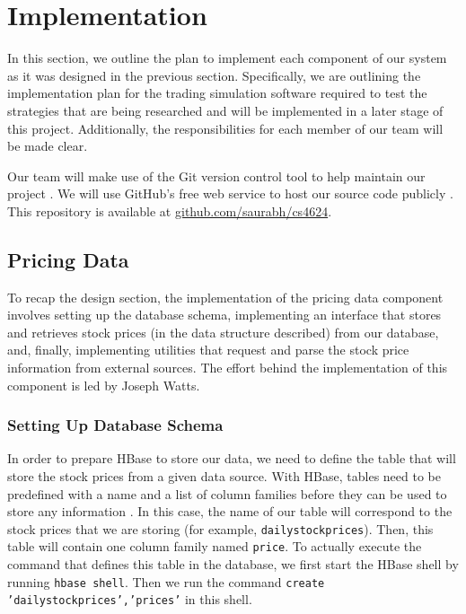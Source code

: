 
\section{Implementation}

In this section, we outline the plan to implement each component of our system as it was designed in the previous section.
Specifically, we are outlining the implementation plan for the trading simulation software required to test the strategies that are being researched and will be implemented in a later stage of this project.
Additionally, the responsibilities for each member of our team will be made clear.

Our team will make use of the Git version control tool to help maintain our project \cite{git}.
We will use GitHub's free web service to host our source code publicly \cite{github}.
This repository is available at \url{github.com/saurabh/cs4624}.

\subsection{Pricing Data}

To recap the design section, the implementation of the pricing data component involves setting up the database schema, implementing an interface that stores and retrieves stock prices (in the data structure described) from our database, and, finally, implementing utilities that request and parse the stock price information from external sources.
The effort behind the implementation of this component is led by Joseph Watts.

\subsubsection{Setting Up Database Schema}

In order to prepare HBase to store our data, we need to define the table that will store the stock prices from a given data source.
With HBase, tables need to be predefined with a name and a list of column families before they can be used to store any information \cite{hbase}.
In this case, the name of our table will correspond to the stock prices that we are storing (for example, \texttt{dailystockprices}).
Then, this table will contain one column family named \texttt{price}.
To actually execute the command that defines this table in the database, we first start the HBase shell by running \texttt{hbase shell}.
Then we run the command \texttt{create 'dailystockprices','prices'} in this shell.


